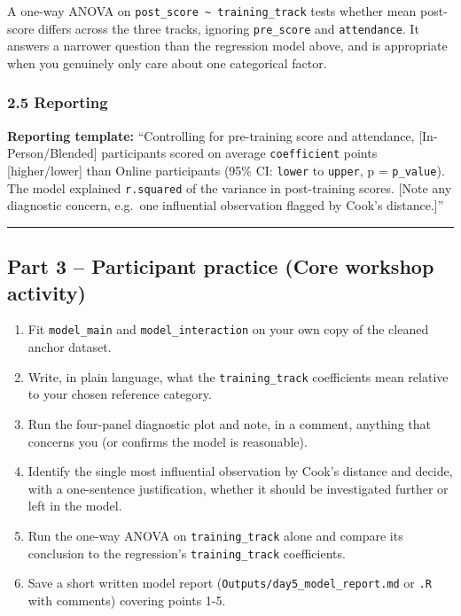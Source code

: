 \documentclass[11pt]{article}
\newenvironment{Shaded}{\begin{snugshade}}{\end{snugshade}}
\newcommand{\FunctionTok}[1]{\textcolor[rgb]{0.13,0.29,0.53}{\textbf{#1}}}
\newcommand{\NormalTok}[1]{#1}
\newcommand{\SpecialCharTok}[1]{\textcolor[rgb]{0.81,0.36,0.00}{\textbf{#1}}}
\providecommand{\tightlist}{%
  \setlength{\itemsep}{0pt}\setlength{\parskip}{0pt}}
\begin{document}
A one-way ANOVA on
\texttt{post\_score\ \textasciitilde{}\ training\_track} tests whether
mean post-score differs across the three tracks, ignoring
\texttt{pre\_score} and \texttt{attendance}. It answers a narrower
question than the regression model above, and is appropriate when you
genuinely only care about one categorical factor.

\hypertarget{reporting}{%
\subsubsection{2.5 Reporting}\label{reporting}}

\textbf{Reporting template:} ``Controlling for pre-training score and
attendance, {[}In-Person/Blended{]} participants scored on average
\texttt{coefficient} points {[}higher/lower{]} than Online participants
(95\% CI: \texttt{lower} to \texttt{upper}, p = \texttt{p\_value}). The
model explained \texttt{r.squared} of the variance in post-training
scores. {[}Note any diagnostic concern, e.g.~one influential observation
flagged by Cook's distance.{]}''

\begin{Shaded}
\end{Shaded}

\begin{center}\rule{0.5\linewidth}{0.5pt}\end{center}

\hypertarget{part-3-participant-practice-core-workshop-activity}{%
\subsection{Part 3 -- Participant practice (Core workshop
activity)}\label{part-3-participant-practice-core-workshop-activity}}

\begin{enumerate}
\def\labelenumi{\arabic{enumi}.}
\tightlist
\item
  Fit \texttt{model\_main} and \texttt{model\_interaction} on your own
  copy of the cleaned anchor dataset.
\item
  Write, in plain language, what the \texttt{training\_track}
  coefficients mean relative to your chosen reference category.
\item
  Run the four-panel diagnostic plot and note, in a comment, anything
  that concerns you (or confirms the model is reasonable).
\item
  Identify the single most influential observation by Cook's distance
  and decide, with a one-sentence justification, whether it should be
  investigated further or left in the model.
\item
  Run the one-way ANOVA on \texttt{training\_track} alone and compare
  its conclusion to the regression's \texttt{training\_track}
  coefficients.
\item
  Save a short written model report
  (\texttt{Outputs/day5\_model\_report.md} or \texttt{.R} with comments)
  covering points 1-5.
\end{enumerate}
\end{document}
